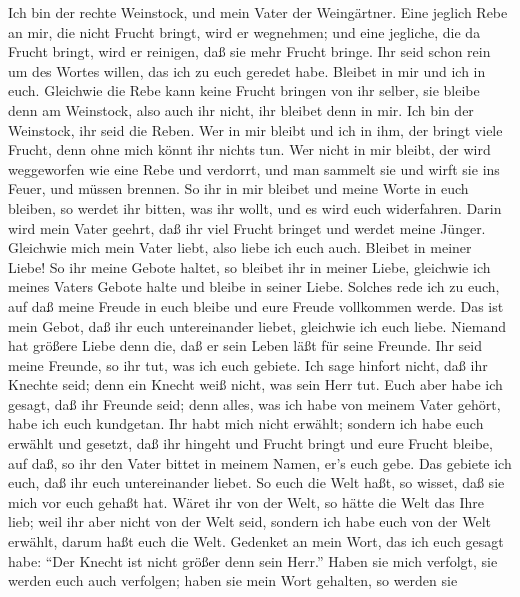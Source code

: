  Ich bin der rechte Weinstock, und mein Vater der
Weingärtner.  Eine jeglich Rebe an mir, die nicht Frucht
bringt, wird er wegnehmen; und eine jegliche, die da Frucht bringt, wird
er reinigen, daß sie mehr Frucht bringe.  Ihr seid schon
rein um des Wortes willen, das ich zu euch geredet habe. 
Bleibet in mir und ich in euch. Gleichwie die Rebe kann keine Frucht
bringen von ihr selber, sie bleibe denn am Weinstock, also auch ihr
nicht, ihr bleibet denn in mir.  Ich bin der Weinstock, ihr
seid die Reben. Wer in mir bleibt und ich in ihm, der bringt viele
Frucht, denn ohne mich könnt ihr nichts tun.  Wer nicht in
mir bleibt, der wird weggeworfen wie eine Rebe und verdorrt, und man
sammelt sie und wirft sie ins Feuer, und müssen brennen.  So
ihr in mir bleibet und meine Worte in euch bleiben, so werdet ihr
bitten, was ihr wollt, und es wird euch widerfahren.  Darin
wird mein Vater geehrt, daß ihr viel Frucht bringet und werdet meine
Jünger.  Gleichwie mich mein Vater liebt, also liebe ich
euch auch. Bleibet in meiner Liebe!  So ihr meine Gebote
haltet, so bleibet ihr in meiner Liebe, gleichwie ich meines Vaters
Gebote halte und bleibe in seiner Liebe.  Solches rede ich
zu euch, auf daß meine Freude in euch bleibe und eure Freude vollkommen
werde.  Das ist mein Gebot, daß ihr euch untereinander
liebet, gleichwie ich euch liebe.  Niemand hat größere
Liebe denn die, daß er sein Leben läßt für seine Freunde. 
Ihr seid meine Freunde, so ihr tut, was ich euch gebiete. 
Ich sage hinfort nicht, daß ihr Knechte seid; denn ein Knecht weiß
nicht, was sein Herr tut. Euch aber habe ich gesagt, daß ihr Freunde
seid; denn alles, was ich habe von meinem Vater gehört, habe ich euch
kundgetan.  Ihr habt mich nicht erwählt; sondern ich habe
euch erwählt und gesetzt, daß ihr hingeht und Frucht bringt und eure
Frucht bleibe, auf daß, so ihr den Vater bittet in meinem Namen, er's
euch gebe.  Das gebiete ich euch, daß ihr euch
untereinander liebet.  So euch die Welt haßt, so wisset,
daß sie mich vor euch gehaßt hat.  Wäret ihr von der Welt,
so hätte die Welt das Ihre lieb; weil ihr aber nicht von der Welt seid,
sondern ich habe euch von der Welt erwählt, darum haßt euch die Welt.
 Gedenket an mein Wort, das ich euch gesagt habe: ``Der
Knecht ist nicht größer denn sein Herr.'' Haben sie mich verfolgt, sie
werden euch auch verfolgen; haben sie mein Wort gehalten, so werden sie
